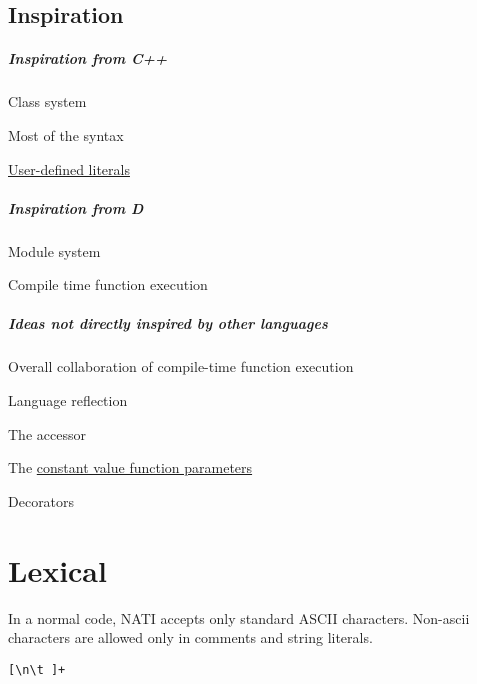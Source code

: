 \section{Inspiration}
\paragraph{Inspiration from C++}
\begin{compactitem}
	\item Class system
	\item Most of the syntax
	\item \hyperref[userDefinedLiterals]{User-defined literals}
\end{compactitem}

\paragraph{Inspiration from D}
\begin{compactitem}
	\item Module system
	\item Compile time function execution
\end{compactitem}

\paragraph{Ideas not directly inspired by other languages}
\begin{compactitem}
	\item Overall collaboration of compile-time function execution
	\item Language reflection
	\item The \hyperref[colonAccessor]{\kwd{:}} accessor
	\item The \hyperref[constantValueParameter]{constant value function parameters}	
	\item Decorators
\end{compactitem}

\chapter{Lexical}
In a normal code, NATI accepts only standard ASCII characters. Non-ascii characters are allowed only in comments and string literals.

\begin{grammar}
	 \verb|[\n\t ]+|
\end{grammar}

